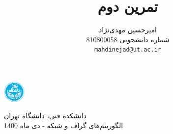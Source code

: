 \documentclass{article}
\title{تمرین دوم}
\author{%
  امیرحسین مهدی‌نژاد\\
  شماره دانشجویی 810800058\\
  \texttt{mahdinejad@ut.ac.ir} \\
}
\begin{document}
\begin{minipage}{0.1\textwidth}%
\includegraphics[width=1.1cm]{Photos/UT_logo.png}
\end{minipage}%
\hfill%
\begin{minipage}{0.9\textwidth}\raggedleft
دانشکده فنی، دانشگاه تهران\\
الگوریتم‌های گراف و شبکه - 
دی
ماه 1400\\
\end{minipage}


\makepertitle


\end{document}
